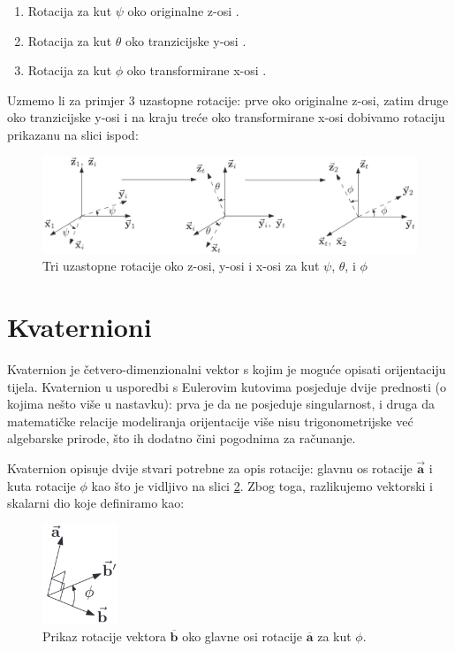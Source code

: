 \documentclass[times, utf8, diplomski, numeric]{templates/template}
\begin{document}
{{        \begin{enumerate}
            \item Rotacija za kut $\psi$ oko originalne z-osi .
            \item Rotacija za kut $\theta$ oko tranzicijske y-osi .
            \item Rotacija za kut $\phi$ oko transformirane x-osi .
        \end{enumerate}

        Uzmemo li za primjer 3 uzastopne rotacije: prve oko originalne z-osi, zatim druge oko tranzicijske y-osi i na kraju treće oko transformirane x-osi dobivamo rotaciju prikazanu na slici ispod: 

        \begin{figure}[htb]
        \centering
        \includegraphics[width=1.0\textwidth]{images/eulerovi_kutovi.jpg}
        \caption{Tri uzastopne rotacije oko z-osi, y-osi i x-osi za kut $\psi$, $\theta$, i $\phi$}
        \label{fig:euler_rotacija}
        \end{figure}
    }

    \section{Kvaternioni}{
        Kvaternion je četvero-dimenzionalni vektor s kojim je moguće opisati orijentaciju tijela. Kvaternion u usporedbi s Eulerovim kutovima posjeduje dvije prednosti (o kojima nešto više u nastavku): prva je da ne posjeduje singularnost, i druga da matematičke relacije modeliranja orijentacije više nisu trigonometrijske već algebarske prirode, što ih dodatno čini pogodnima za računanje.

        Kvaternion opisuje dvije stvari potrebne za opis rotacije: glavnu os rotacije  $\overrightarrow{\boldsymbol{a}}$ i kuta rotacije $\phi$ kao što je vidljivo na slici \ref{fig:principal_axis_rotation}. Zbog toga, razlikujemo vektorski i skalarni dio koje definiramo kao:

        \begin{figure}[htb]
        \centering
        \includegraphics[width=0.2\textwidth]{images/principal_axis_rotation.png}
        \caption{Prikaz rotacije vektora $\boldsymbol{\overline{b}}$ oko glavne osi rotacije $\boldsymbol{\overline{a}}$ za kut $\phi$.}
        \label{fig:principal_axis_rotation}
        \end{figure}

}}
\end{document}
